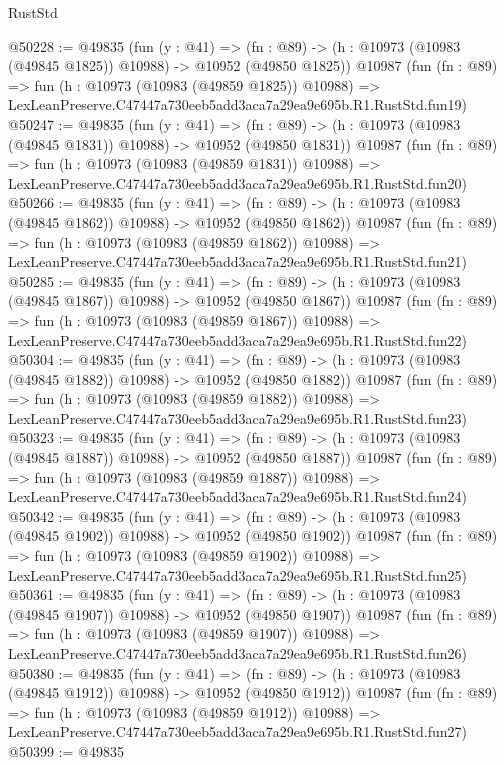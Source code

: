 \begin{lexlean}{RustStd}
\begin{coremodule}
@50228 := @49835
    (fun (y : @41) =>
    (fn : @89) -> (h : @10973 (@10983 (@49845 @1825)) @10988) -> @10952 (@49850 @1825))
    @10987
    (fun (fn : @89) =>
    fun (h : @10973 (@10983 (@49859 @1825)) @10988) =>
    LexLeanPreserve.C47447a730eeb5add3aca7a29ea9e695b.R1.RustStd.fun19)
@50247 := @49835
    (fun (y : @41) =>
    (fn : @89) -> (h : @10973 (@10983 (@49845 @1831)) @10988) -> @10952 (@49850 @1831))
    @10987
    (fun (fn : @89) =>
    fun (h : @10973 (@10983 (@49859 @1831)) @10988) =>
    LexLeanPreserve.C47447a730eeb5add3aca7a29ea9e695b.R1.RustStd.fun20)
@50266 := @49835
    (fun (y : @41) =>
    (fn : @89) -> (h : @10973 (@10983 (@49845 @1862)) @10988) -> @10952 (@49850 @1862))
    @10987
    (fun (fn : @89) =>
    fun (h : @10973 (@10983 (@49859 @1862)) @10988) =>
    LexLeanPreserve.C47447a730eeb5add3aca7a29ea9e695b.R1.RustStd.fun21)
@50285 := @49835
    (fun (y : @41) =>
    (fn : @89) -> (h : @10973 (@10983 (@49845 @1867)) @10988) -> @10952 (@49850 @1867))
    @10987
    (fun (fn : @89) =>
    fun (h : @10973 (@10983 (@49859 @1867)) @10988) =>
    LexLeanPreserve.C47447a730eeb5add3aca7a29ea9e695b.R1.RustStd.fun22)
@50304 := @49835
    (fun (y : @41) =>
    (fn : @89) -> (h : @10973 (@10983 (@49845 @1882)) @10988) -> @10952 (@49850 @1882))
    @10987
    (fun (fn : @89) =>
    fun (h : @10973 (@10983 (@49859 @1882)) @10988) =>
    LexLeanPreserve.C47447a730eeb5add3aca7a29ea9e695b.R1.RustStd.fun23)
@50323 := @49835
    (fun (y : @41) =>
    (fn : @89) -> (h : @10973 (@10983 (@49845 @1887)) @10988) -> @10952 (@49850 @1887))
    @10987
    (fun (fn : @89) =>
    fun (h : @10973 (@10983 (@49859 @1887)) @10988) =>
    LexLeanPreserve.C47447a730eeb5add3aca7a29ea9e695b.R1.RustStd.fun24)
@50342 := @49835
    (fun (y : @41) =>
    (fn : @89) -> (h : @10973 (@10983 (@49845 @1902)) @10988) -> @10952 (@49850 @1902))
    @10987
    (fun (fn : @89) =>
    fun (h : @10973 (@10983 (@49859 @1902)) @10988) =>
    LexLeanPreserve.C47447a730eeb5add3aca7a29ea9e695b.R1.RustStd.fun25)
@50361 := @49835
    (fun (y : @41) =>
    (fn : @89) -> (h : @10973 (@10983 (@49845 @1907)) @10988) -> @10952 (@49850 @1907))
    @10987
    (fun (fn : @89) =>
    fun (h : @10973 (@10983 (@49859 @1907)) @10988) =>
    LexLeanPreserve.C47447a730eeb5add3aca7a29ea9e695b.R1.RustStd.fun26)
@50380 := @49835
    (fun (y : @41) =>
    (fn : @89) -> (h : @10973 (@10983 (@49845 @1912)) @10988) -> @10952 (@49850 @1912))
    @10987
    (fun (fn : @89) =>
    fun (h : @10973 (@10983 (@49859 @1912)) @10988) =>
    LexLeanPreserve.C47447a730eeb5add3aca7a29ea9e695b.R1.RustStd.fun27)
@50399 := @49835

\end{coremodule}
\end{lexlean}
